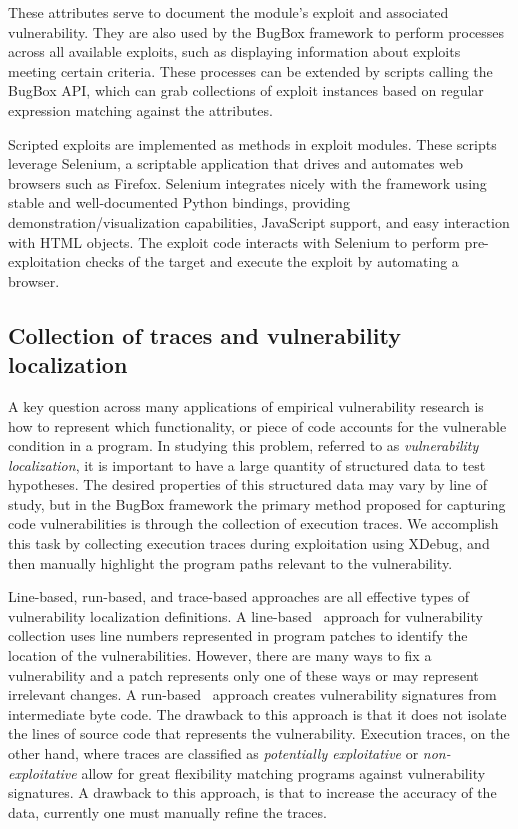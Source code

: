 \documentclass[letterpaper,twocolumn,10pt]{article}
\begin{document}
These attributes serve to document the module's exploit and associated vulnerability. They are also used by the BugBox framework to perform processes across all available exploits, such as displaying information about exploits meeting certain criteria. These processes can be extended by scripts calling the BugBox API, which can grab collections of exploit instances based on regular expression matching against the attributes.

Scripted exploits are implemented as methods in exploit modules. These scripts leverage Selenium, a scriptable application that drives and automates web browsers such as Firefox. Selenium integrates nicely with the framework using stable and well-documented Python bindings, providing demonstration/visualization capabilities, JavaScript support, and easy interaction with HTML objects. The exploit code interacts with Selenium to perform pre-exploitation checks of the target and execute the exploit by automating a browser.

\subsection{Collection of traces and vulnerability localization}

A key question across many applications of empirical vulnerability research is how to represent which functionality, or piece of code accounts for the vulnerable condition in a program. In studying this problem, referred to as \emph{vulnerability localization}, it is important to have a large quantity of structured data to test hypotheses. The desired properties of this structured data may vary by line of study, but in the BugBox framework the primary method proposed for capturing code vulnerabilities is through the collection of execution traces. We accomplish this task by collecting execution traces during exploitation using XDebug, and then manually highlight the program paths relevant to the vulnerability.

Line-based, run-based, and trace-based approaches are all effective types of vulnerability localization definitions. A line-based~\cite{4630094} approach for vulnerability collection uses line numbers represented in program patches to identify the location of the vulnerabilities.  However, there are many ways to fix a vulnerability and a patch represents only one of these ways or may represent irrelevant changes.  A run-based~\cite{Song:2008:BNA:1496255.1496257} approach creates vulnerability signatures from intermediate byte code. The drawback to this approach is that it does not isolate the lines of source code that represents the vulnerability. Execution traces, on the other hand, where traces are classified as \emph{potentially exploitative} or \emph{non-exploitative} allow for great flexibility matching programs against vulnerability signatures. A drawback to this approach, is that to increase the accuracy of the data, currently one must manually refine the traces.
\end{document}
